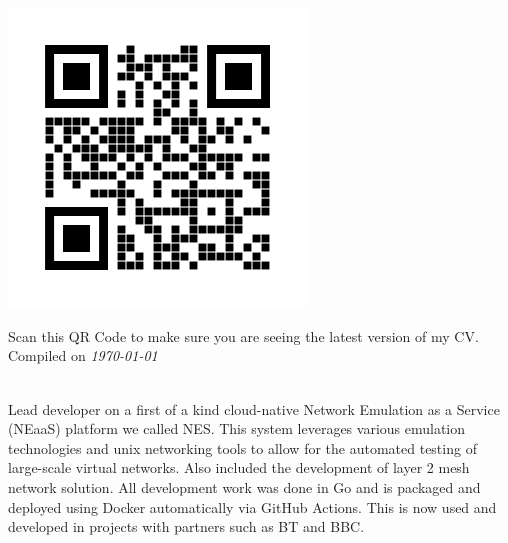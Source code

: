 \documentclass[9pt]{developercv} %
\begin{document}
\begin{minipage}[t]{0.35\textwidth}
	\vspace{-\baselineskip} %
	\\
	\divider\\
	\begin{minipage}[t]{0.25\textwidth}
		\vspace{-\baselineskip} %
		\includegraphics[width=1\linewidth]{assets/websiteqr.png}
	\end{minipage}
	\hfill
	\begin{minipage}[t]{0.75\textwidth}
		\vspace{-\baselineskip} %
		Scan this QR Code to make sure you are seeing the latest version of my CV.\\
		Compiled on \textit{\today}\\
	\end{minipage}
\end{minipage}
\hfill
\begin{minipage}[t]{0.6\textwidth}
	\vspace{-\baselineskip} %
	\\
	Lead developer on a first of a kind cloud-native Network Emulation as a
	Service (NEaaS) platform we called NES. This system leverages various emulation
	technologies and unix networking tools to allow for the automated testing of
	large-scale virtual networks. Also included the development of layer 2 mesh
	network solution. All development work was done in Go and is packaged and
	deployed using Docker automatically via GitHub Actions. This is now used and
	developed in
	projects with partners such as BT and BBC.
\end{minipage}

\end{document}
